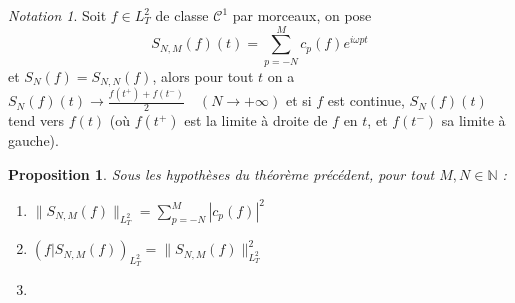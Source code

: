 \documentclass[]{article}
\newtheorem{myproposition}{Proposition}
\theoremstyle{remark}
\newtheorem{mynot}{Notation}
\theoremstyle{definition}
\begin{document}
\begin{mynot}
	Soit $f \in L_T^2$ de classe $\mathcal{C}^1$ par morceaux, on pose $$S_{N, M}(f)(t) = \sum_{p = -N}^{M} c_p(f)e^{i\omega p t}$$ et $S_N(f) = S_{N, N}(f)$, alors pour tout $t$ on a $\displaystyle S_N(f)(t) \longrightarrow \frac{f(t^+)+f(t^-)}{2} \quad (N \to +\infty)$ et si $f$ est continue, $S_N(f)(t)$ tend vers $f(t)$ (où $f(t^+)$ est la limite à droite de $f$ en $t$, et $f(t^-)$ sa limite à gauche).
\end{mynot}

\begin{myproposition}
	Sous les hypothèses du théorème précédent, pour tout $M, N \in \mathbb{N}$ :
	
	\begin{enumerate}
		\item $\displaystyle \|S_{N,M}(f)\|_{L_T^2} = \sum_{p=-N}^{M} |c_p(f)|^2$
		\item $\displaystyle (f | S_{N, M}(f))_{L^2_T} = \|S_{N, M}(f)\|^2_{L_T^2}$
		\item 
	\end{enumerate}
\end{myproposition}
\end{document}
